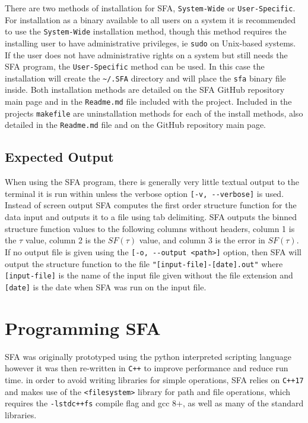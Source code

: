 \documentclass[12pt, oneside]{smuthesis}
\begin{document}
There are two methods of installation for SFA, \verb|System-Wide| or \verb|User-Specific|. For installation as a binary available to all users on a system it is recommended to use the \verb|System-Wide| installation method, though this method requires the installing user to have administrative privileges, ie \verb|sudo| on Unix-based systems. If the user does not have administrative rights on a system but still needs the SFA program, the \verb|User-Specific| method can be used. In this case the installation will create the \verb|~/.SFA| directory and will place the \verb|sfa| binary file inside. Both installation methods are detailed on the SFA GitHub repository main page and in the \verb|Readme.md| file included with the project. Included in the projects \verb|makefile| are uninstallation methods for each of the install methods, also detailed in the \verb|Readme.md| file and on the GitHub repository main page.

\subsection{\sc Expected Output} \label{expectedOutput}

When using the SFA program, there is generally very little textual output to the terminal it is run within unless the verbose option \verb|[-v, --verbose]| is used. Instead of screen output SFA computes the first order structure function for the data input and outputs it to a file using tab delimiting. SFA outputs the binned structure function values to the following columns without headers, column 1 is the $\tau$ value, column 2 is the $SF(\tau)$ value, and column 3 is the error in $SF(\tau)$. If no output file is given using the \verb|[-o, --output <path>]| option, then SFA will output the structure function to the file \verb|"[input-file]-[date].out"| where \verb|[input-file]| is the name of the input file given without the file extension and \verb|[date]| is the date when SFA was run on the input file.

\section{\sc Programming SFA} \label{programmingSFA}

 SFA was originally prototyped using the python interpreted scripting language however it was then re-written in \verb|C++| to improve performance and reduce run time. in order to avoid writing libraries for simple operations, SFA relies on \verb|C++17| and makes use of the \verb|<filesystem>| library for path and file operations, which requires the \verb|-lstdc++fs| compile flag and gcc 8+, as well as many of the standard libraries.
\end{document}
